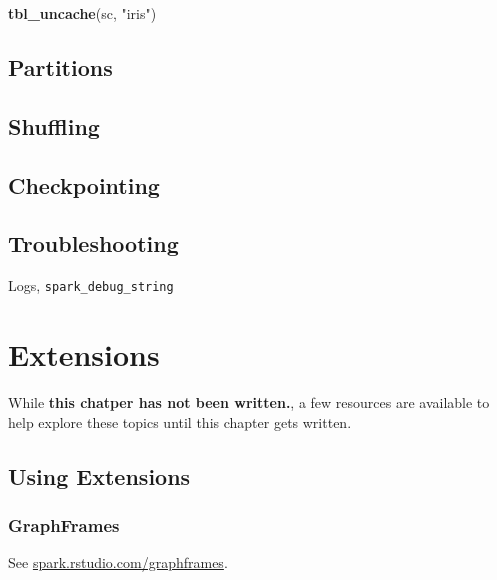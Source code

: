 \documentclass[]{book}
\newenvironment{Shaded}{\begin{snugshade}}{\end{snugshade}}
\newcommand{\KeywordTok}[1]{\textcolor[rgb]{0.13,0.29,0.53}{\textbf{#1}}}
\newcommand{\NormalTok}[1]{#1}
\newcommand{\StringTok}[1]{\textcolor[rgb]{0.31,0.60,0.02}{#1}}
\theoremstyle{definition}
\theoremstyle{definition}
\theoremstyle{definition}
\theoremstyle{remark}
\begin{document}
\begin{Shaded}
\begin{Highlighting}[]
\KeywordTok{tbl_uncache}\NormalTok{(sc, }\StringTok{"iris"}\NormalTok{)}
\end{Highlighting}
\end{Shaded}

\hypertarget{partitions}{%
\section{Partitions}\label{partitions}}

\hypertarget{shuffling}{%
\section{Shuffling}\label{shuffling}}

\hypertarget{checkpointing}{%
\section{Checkpointing}\label{checkpointing}}

\hypertarget{troubleshooting}{%
\section{Troubleshooting}\label{troubleshooting}}

Logs, \texttt{spark\_debug\_string}

\hypertarget{extensions}{%
\chapter{Extensions}\label{extensions}}

While \textbf{this chatper has not been written.}, a few resources are
available to help explore these topics until this chapter gets written.

\hypertarget{using-extensions}{%
\section{Using Extensions}\label{using-extensions}}

\hypertarget{graphframes}{%
\subsection{GraphFrames}\label{graphframes}}

See
\href{http://spark.rstudio.com/graphframes/}{spark.rstudio.com/graphframes}.
\end{document}
